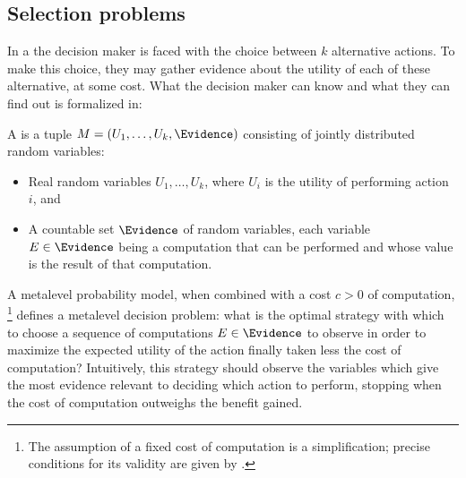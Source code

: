 




\subsection{Selection problems}


In a  the decision maker is faced with the choice between
$k$ alternative actions.  To make this choice, they may gather evidence about the
utility of each of these alternative, at some cost.  What the decision maker can know
and what they can find out is formalized in:

\begin{dfn} \label{dfn:metalevel-model}
	A  is a tuple $M=(U_1,\dots,U_k,\Evidence)$ 
	consisting of jointly distributed random variables:
	\begin{itemize}
		\item Real random variables $U_1,\dots,U_k$, where $U_i$ is the utility of performing action~$i$, and
		\item A countable set $\Evidence$ of random variables, each variable $E\in\Evidence$ being 
		      a computation that can be performed and whose value is the result of that computation.
	\end{itemize}
\end{dfn}

A metalevel probability model, when combined with a cost $c>0$ of computation,%
\footnote{The assumption of a fixed cost of computation is a simplification; 
	precise conditions for its validity are given by \citep{Harada:1997}.} 
defines a metalevel decision problem: what is the optimal strategy with which to choose a sequence 
of computations $E\in\Evidence$ to observe in order to maximize the expected utility 
of the action finally taken less the cost of computation?  Intuitively, 
this strategy should observe the variables which give the most evidence relevant
to deciding which action to perform, stopping when the cost of computation 
outweighs the benefit gained.

